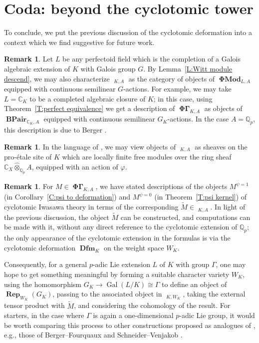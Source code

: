 \documentclass[12pt]{amsart}
\theoremstyle{definition}
\newtheorem{remark}[theorem]{Remark}
\numberwithin{equation}{theorem}
\newcommand{\CC}{\mathbb{C}}
\newcommand{\Qp}{\mathbb{Q}_p}
\newcommand{\QQ}{\mathbb{Q}}
\DeclareMathOperator{\BPair}{\mathbf{BPair}}
\DeclareMathOperator{\Dfm}{\mathbf{Dfm}}
\DeclareMathOperator{\Gal}{Gal}
\DeclareMathOperator{\PhiGamma}{\mathbf{\Phi \Gamma}}
\DeclareMathOperator{\PhiGammatilde}{\widetilde{\mathbf{\Phi \Gamma}}}
\DeclareMathOperator{\PhiMod}{\mathbf{\Phi Mod}}
\DeclareMathOperator{\Rep}{\mathbf{Rep}}
\begin{document}
\section{Coda: beyond the cyclotomic tower}
\label{sec:coda}

To conclude, we put the previous discussion of the cyclotomic deformation into a context which we find suggestive for future work.

\begin{remark} \label{R:general field}
Let $L$ be any perfectoid field which is the completion of a Galois algebraic extension of $K$ with Galois group $G$.
By Lemma~\ref{L:Witt module descend}, we may also characterize $\PhiGammatilde_{K,A}$ 
as the category of objects of $\PhiMod_{L,A}$ equipped with continuous semilinear $G$-actions. For example, we may take $L = \CC_K$ to be a completed algebraic closure of $K$;
in this case, using Theorem~\ref{T:perfect equivalence} we get a description of
$\PhiGamma_{K,A}$ as objects of $\BPair_{\CC_K,A}$ equipped with continuous semilinear $G_K$-actions. In the case $A = \QQ_p$, this description is due to Berger \cite{berger-b-pairs}.
\end{remark}

\begin{remark}
In the language of \cite{kedlaya-liu1}, we may view objects of $\PhiGammatilde_{K,A}$
as sheaves on the pro-\'etale site of $K$ which are locally finite free modules over the ring sheaf $\CC_X \widehat{\otimes}_{\Qp} A$, equipped with an action of $\varphi$.
\end{remark}

\begin{remark}
For $M \in \PhiGamma_{K,A}$, we have stated descriptions of the objects $M^{\psi=1}$ 
(in Corollary~\ref{C:psi to deformation})
and $M^{\psi=0}$
(in Theorem~\ref{T:psi kernel}) of cyclotomic Iwasawa theory
in terms of the corresponding $\tilde{M} \in \PhiGammatilde_{K,A}$.
In light of the previous discussion, the object $\tilde{M}$ can be constructed, and computations can be made with it, without any direct reference to the cyclotomic extension of $\QQ_p$; the only appearance of the cyclotomic extension in the formulas is via the cyclotomic deformation $\Dfm_K$ on the weight space $W_K$.

Consequently, for a general $p$-adic Lie extension $L$ of $K$ with group $\Gamma$,
one may hope to get something meaningful by forming a suitable character variety $W_K$, using the homomorphism $G_K \to \Gal(L/K) \cong \Gamma$ to define an object of $\Rep_{W_K}(G_K)$, passing to the associated object in $\PhiGammatilde_{K,W_K}$,
taking the external tensor product with $\tilde{M}$,
and considering the cohomology of the result. For starters, in the case where $\Gamma$ is again a one-dimensional $p$-adic Lie group, it would be worth comparing this process to other constructions proposed as analogues of \cite{berger-explicit}, e.g.,
those of Berger--Fourquaux \cite{berger-fourquaux} and Schneider--Venjakob
\cite{schneider-venjakob}.
\end{remark}
\end{document}
